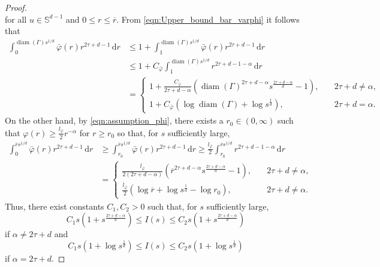 \documentclass{article}
\theoremstyle{definition}
\numberwithin{equation}{section}
\theoremstyle{remark}
\begin{document}
\begin{proof}
$$$$
for all $u\in \mathbb{S}^{d-1}$ and $0\leq r\leq \overline{r}$.
From \eqref{eqn:Upper_bound_bar_varphi} it follows that
\begin{align*}
\int_0^{\operatorname{diam}(\Gamma)s^{1/d}} \bar{\varphi}(r) r^{2\tau+d-1} \, \mathrm{d}r & \leq 1 + \int_1^{\operatorname{diam}(\Gamma)s^{1/d}} \bar{\varphi}(r) r^{2\tau+d-1} \, \mathrm{d}r \\
& \leq 1 + C_{\bar{\varphi}}\int_1^{\operatorname{diam}(\Gamma)s^{1/d}} r^{2\tau+d-1-\alpha} \, \mathrm{d}r \\
& =\begin{cases} 1+ \frac{C_{\bar{\varphi}}}{2\tau+d-\alpha} (\operatorname{diam}(\Gamma)^{2\tau+d-\alpha}s^{\frac{2\tau+d-\alpha}{d}}-1), & \quad 2\tau+d\neq\alpha, \\  1+C_{\bar{\varphi}} (\log \operatorname{diam}(\Gamma)+  \log s^{\frac{1}{d}}), & \quad 2\tau+d=\alpha. \end{cases}
\end{align*}
On the other hand, by \eqref{eqn:assumption_phi}, there exists a $r_0\in(0,\infty)$ such that $\varphi(r)\geq \frac{l_{\bar{\varphi}}}{2}r^{-\alpha}$ for $r\ge r_0$ so that, for $s$ sufficiently large,
\begin{align*}
\int_0^{\overline{r}s^{1/d}} \bar{\varphi}(r) r^{2\tau+d-1} \, \mathrm{d}r & \geq \int_{r_0}^{\overline{r}s^{1/d}} \bar{\varphi}(r) r^{2\tau+d-1} \, \mathrm{d}r \geq \frac{l_{\bar{\varphi}}}{2} \int_{r_0}^{\overline{r}s^{1/d}}  r^{2\tau+d-1-\alpha} \, \mathrm{d}r \\
& = \begin{cases} \frac{l_{\bar{\varphi}}}{2(2\tau+d-\alpha)} (\overline{r}^{2\tau+d-\alpha}s^{\frac{2\tau+d-\alpha}{d}} - 1), & \quad 2\tau+d\neq\alpha,\\ \frac{l_{\bar{\varphi}}}{2} ( \log \overline{r}+  \log s^{\frac{1}{d}} -\log r_0), & \quad 2\tau+d\neq\alpha. \end{cases}
\end{align*}
Thus, there exist constants $C_1, C_2>0$ such that, for $s$ sufficiently large,
$$ C_1 s (1 + s^{\frac{2\tau + d -\alpha}{d}} )\leq I(s) \leq C_2 s (1 + s^{\frac{2\tau + d -\alpha}{d}} ) $$
if $\alpha \neq 2\tau +d$ and
$$ C_1 s (1 + \log s^{\frac{1}{d}} )\leq I(s) \leq C_2 s (1 + \log s^{\frac{1}{d}} ) $$
if $\alpha = 2\tau +d$.


\end{proof}
\end{document}
